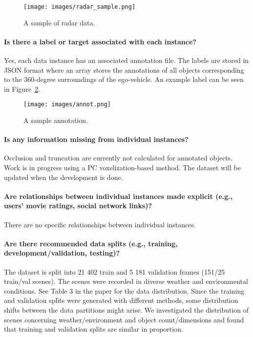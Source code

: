 \documentclass{article}
\begin{document}
\begin{figure}[t]
  \centering
   \texttt{[image: images/radar\_sample.png]}
   \caption{A sample of radar data.}
   \label{fig:radar}
\end{figure}

\paragraph{Is there a label or target associated with each instance?} Yes, each data instance has an associated annotation file. The labels are stored in JSON format where an array stores the annotations of all objects corresponding to the 360-degree surroundings of the ego-vehicle. An example label can be seen in Figure~\ref{fig:annot}.
\begin{figure}[t]
  \centering
   \texttt{[image: images/annot.png]}
   \caption{A sample annotation.}
   \label{fig:annot}
\end{figure}

\paragraph{Is any information missing from individual instances?} Occlusion and truncation are currently not calculated for annotated objects. Work is in progress using a PC voxelization-based method. The dataset will be updated when the development is done.

\paragraph{Are relationships between individual instances made explicit (e.g., users’ movie ratings, social network links)?} There are no specific relationships between individual instances.

\paragraph{Are there recommended data splits (e.g., training, development/validation, testing)?} The dataset is split into 21 402 train and 5 181 validation frames (151/25 train/val scenes). The scenes were recorded in diverse weather and environmental conditions. See Table 3 in the paper for the data distribution. Since the training and validation splits were generated with different methods, some distribution shifts between the data partitions might arise. We investigated the distribution of scenes concerning weather/environment and object count/dimensions and found that training and validation splits are similar in proportion.
\end{document}
